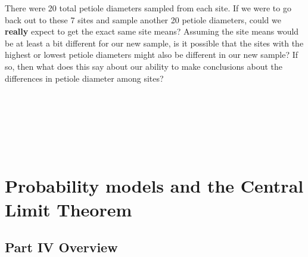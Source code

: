 \documentclass[
]{scrbook}
\begin{document}
There were 20 total petiole diameters sampled from each site.
If we were to go back out to these 7 sites and sample another 20 petiole diameters, could we \textbf{really} expect to get the exact same site means?
Assuming the site means would be at least a bit different for our new sample, is it possible that the sites with the highest or lowest petiole diameters might also be different in our new sample?
If so, then what does this say about our ability to make conclusions about the differences in petiole diameter among sites?

\begin{verbatim}






\end{verbatim}

\hypertarget{part-probability-models-and-the-central-limit-theorem}{%
\part{Probability models and the Central Limit Theorem}\label{part-probability-models-and-the-central-limit-theorem}}

\hypertarget{Week4}{%
\chapter*{Part IV Overview}\label{Week4}}
\end{document}
